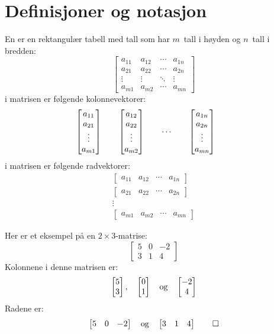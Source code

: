 

\label{ch:matriser}



\section*{Definisjoner og notasjon}



En  er en rektangulær tabell med tall
som har $m$~tall i høyden og $n$~tall i bredden:
\[
\begin{bmatrix}
a_{11} & a_{12} & \cdots & a_{1n} \\
a_{21} & a_{22} & \cdots & a_{2n} \\
\vdots & \vdots & \ddots & \vdots \\
a_{m1} & a_{m2} & \cdots & a_{mn}
\end{bmatrix}
\]
 i matrisen er følgende kolonnevektorer:
\[
\begin{bmatrix} a_{11} \\ a_{21} \\ \vdots \\ a_{m1} \end{bmatrix}\qquad
\begin{bmatrix} a_{12} \\ a_{22} \\ \vdots \\ a_{m2} \end{bmatrix}\qquad
\cdots\qquad
\begin{bmatrix} a_{1n} \\ a_{2n} \\ \vdots \\ a_{mn} \end{bmatrix}\qquad
\]
 i matrisen er følgende radvektorer:
\begin{gather*}
\begin{bmatrix}
a_{11} & a_{12} & \cdots & a_{1n}
\end{bmatrix}
\\
\begin{bmatrix}
a_{21} & a_{22} & \cdots & a_{2n}
\end{bmatrix}
\\
\vdots
\\
\begin{bmatrix}
a_{m1} & a_{m2} & \cdots & a_{mn}
\end{bmatrix}
\end{gather*}

\begin{ex}
Her er et eksempel på en $2 \times 3$-matrise:
\[
\begin{bmatrix}
5 & 0 & -2 \\
3 & 1 &  4
\end{bmatrix}
\]
Kolonnene i denne matrisen er:
\[
\begin{bmatrix} 5 \\ 3 \end{bmatrix},\quad
\begin{bmatrix} 0 \\ 1 \end{bmatrix}\quad\text{og}\quad
\begin{bmatrix} -2 \\ 4 \end{bmatrix}
\]
Radene er:
\[
\begin{bmatrix}
5 & 0 & -2
\end{bmatrix}
\quad\text{og}\quad
\begin{bmatrix}
3 & 1 &  4
\end{bmatrix}
\qedhere
\]
\end{ex}

